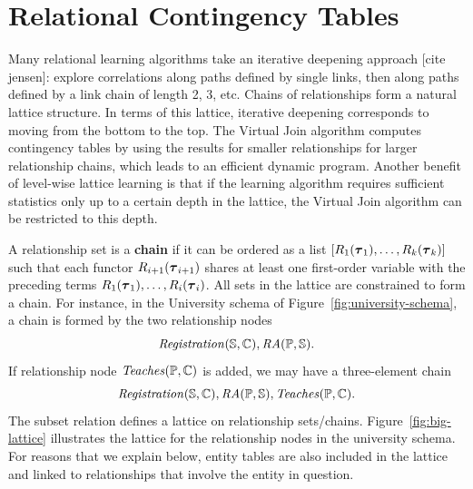 \documentclass{vldb}
\begin{document}
\section{Relational  Contingency Tables}
Many relational learning algorithms take an iterative deepening approach [cite jensen]: explore correlations along paths defined by single links, then along paths defined by a link chain of length 2, 3, etc. 
Chains of relationships form a natural lattice structure. In terms of this lattice, iterative deepening corresponds to moving from the bottom to the top. 
%
The Virtual Join algorithm computes contingency tables by using the results for smaller relationships for larger relationship chains, which leads to an efficient dynamic program. Another benefit of level-wise lattice learning is that if the learning algorithm requires sufficient statistics only up to a certain depth in the lattice, the Virtual Join algorithm can be restricted to this depth. %
%
%

A relationship set is a \textbf{chain} if it can be ordered as a list $[R_{1}(\boldsymbol{\tau}_{1}),\ldots,R_{k}(\boldsymbol{\tau}_{k})]$ 
such that each functor $R_{i+1}(\boldsymbol{\tau}_{i+1})$ shares at least one first-order variable with the preceding terms $R_{1}(\boldsymbol{\tau}_{1}),\ldots,R_{i}(\boldsymbol{\tau}_{i})$.
All sets in the lattice are constrained to form a chain.
%
For instance, in the University schema of Figure~\ref{fig:university-schema}, a %
chain is formed by the two relationship nodes
\[\mathit{Registration}(\mathbb{S},\mathbb{C}),\mathit{RA}(\mathbb{P},\mathbb{S}).\]
If relationship node $\it{Teaches}(\mathbb{P},\mathbb{C})$ is added,
we may have a three-element chain \[\mathit{Registration}(\mathbb{S},\mathbb{C}),\mathit{RA}(\mathbb{P},\mathbb{S}),\it{Teaches}(\mathbb{P},\mathbb{C}).\] 
The subset relation defines a lattice on relationship sets/chains. 
Figure~\ref{fig:big-lattice} illustrates the  lattice for the relationship nodes in the university schema. 
For reasons that we explain below, entity tables are also included in the lattice and linked to relationships that involve the entity in question. 
\end{document}
